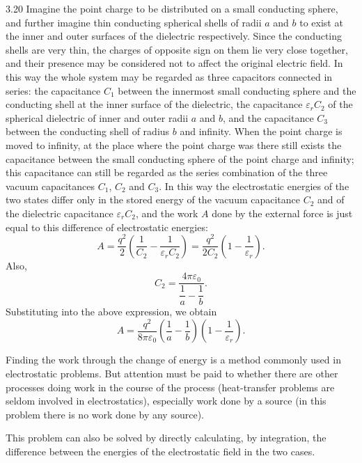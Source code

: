 \begin{solution}{3.20}
Imagine the point charge to be distributed on a small conducting sphere, and further imagine thin conducting spherical shells of radii $a$ and $b$ to exist at the inner and outer surfaces of the dielectric respectively. Since the conducting shells are very thin, the charges of opposite sign on them lie very close together, and their presence may be considered not to affect the original electric field. In this way the whole system may be regarded as three capacitors connected in series: the capacitance $C_1$ between the innermost small conducting sphere and the conducting shell at the inner surface of the dielectric, the capacitance $\varepsilon_rC_2$ of the spherical dielectric of inner and outer radii $a$ and $b$, and the capacitance $C_3$ between the conducting shell of radius $b$ and infinity. When the point charge is moved to infinity, at the place where the point charge was there still exists the capacitance between the small conducting sphere of the point charge and infinity; this capacitance can still be regarded as the series combination of the three vacuum capacitances $C_1$, $C_2$ and $C_3$. In this way the electrostatic energies of the two states differ only in the stored energy of the vacuum capacitance $C_2$ and of the dielectric capacitance $\varepsilon_rC_2$, and the work $A$ done by the external force is just equal to this difference of electrostatic energies:
\[
A=\frac{q^2}{2}\left(\frac{1}{C_2}-\frac{1}{\varepsilon_rC_2}\right)
=\frac{q^2}{2C_2}\left(1-\frac{1}{\varepsilon_r}\right).
\]
Also,
\[
C_2=\frac{4\pi\varepsilon_0}{\dfrac{1}{a}-\dfrac{1}{b}}.
\]
Substituting into the above expression, we obtain
\[
A=\frac{q^2}{8\pi\varepsilon_0}\left(\frac{1}{a}-\frac{1}{b}\right)
\left(1-\frac{1}{\varepsilon_r}\right).
\]

\begin{commentary}
Finding the work through the change of energy is a method commonly used in electrostatic problems. But attention must be paid to whether there are other processes doing work in the course of the process (heat-transfer problems are seldom involved in electrostatics), especially work done by a source (in this problem there is no work done by any source).

This problem can also be solved by directly calculating, by integration, the difference between the energies of the electrostatic field in the two cases.
\end{commentary}
\end{solution}

